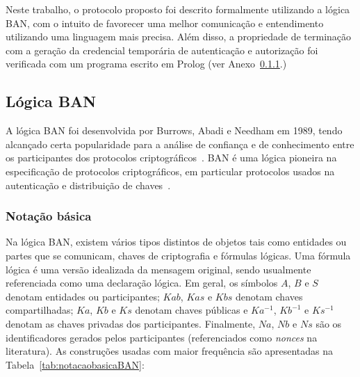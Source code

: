 Neste trabalho, o protocolo proposto foi descrito formalmente utilizando a lógica BAN,
com o intuito de favorecer uma melhor comunicação e entendimento utilizando uma linguagem mais precisa.
Além disso, a propriedade de terminação com a geração da credencial temporária de autenticação e autorização
foi verificada com um programa escrito em Prolog (ver {\color{red}Anexo~\ref{}}.)


\subsection{Lógica BAN}

A lógica BAN foi desenvolvida por Burrows, Abadi e Needham em 1989, tendo alcan\c cado
certa popularidade para a análise de confian\c ca e de conhecimento entre os participantes
dos protocolos criptográficos~\cite{Burrows1990}. BAN \'{e} uma l\'{o}gica pioneira na especifica\c c\~{a}o de
 protocolos criptográficos, em particular protocolos usados na autenticação e
distribuição de chaves~\cite{Burrows1990}.

\subsubsection{Notação básica}

Na lógica BAN, existem vários tipos distintos de objetos tais como entidades ou partes que se
comunicam, chaves de criptografia e fórmulas lógicas. Uma fórmula lógica é uma versão idealizada da mensagem original,
sendo usualmente referenciada como uma declaração lógica. Em geral, os símbolos $A$, $B$ e $S$ denotam
entidades ou participantes; $Kab$, $Kas$ e $Kbs$ denotam chaves compartilhadas; $Ka$, $Kb$ e $Ks$
denotam chaves públicas e $Ka^{-1}$, $Kb^{-1}$ e $Ks^{-1}$ denotam as chaves privadas dos participantes.
Finalmente, $Na$, $Nb$ e $Ns$ são os identificadores gerados pelos participantes (referenciados como \emph{nonces}
na literatura). As construções usadas com maior frequ\^{e}ncia
são apresentadas na Tabela~\ref{tab:notacaobasicaBAN}:

 \newcommand{\RHQuery}{\textbf{[???]}}
\newcommand{\RHRemark}[1]{\textbf{[#1]}}
\newcommand{\Believess}[2]{{#1}\mathrel{\textbf{\mid\equiv}}{#2}}
\newcommand{\Seess}[2]{{#1}\mathrel{\textbf{\triangleleft}}{#2}}
\newcommand{\Saids}[2]{{#1}\mathrel{\textbf{\mid\sim}}{#2}}

\newcommand{\Believes}[2]{{#1}\mathrel{\textbf{acredita}}{#2}}
\newcommand{\Sees}[2]{{#1}\mathrel{\textbf{recebeu}}{#2}}
\newcommand{\Said}[2]{{#1}\mathrel{\textbf{disse}}{#2}}
\newcommand{\Controls}[2]{{#1}\mathrel{\textbf{controla}}{#2}}
\newcommand{\Fresh}[1]{{#1}\,\textbf{novo}}
\newcommand{\Share}[3]{{#1}\stackrel{#2}{\longleftrightarrow}{#3}}
\newcommand{\ShareSecret}[3]{{#1}\stackrel{#2}{\rightleftharpoons}{#3}}
\newcommand{\PubKey}[2]{{}\stackrel{#1}{\mapsto}{#2}}
\newcommand{\Secret}[3]{{#1}\stackrel{#2}{\leftrightharpoons}{#3}}
\newcommand{\Encrypt}[2]{\{\,{#1}\,\}_{#2}}
\newcommand{\EncryptFrom}[3]{\{\,{#1}\,\}_{#2}^{#3}}
\newcommand{\Attach}[2]{\langle {#1}\rangle_{#2}}

